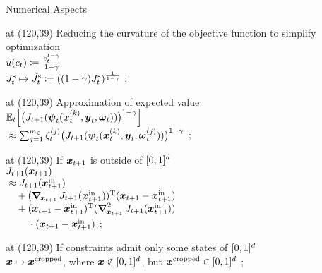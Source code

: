 \begin{frame}{\insertsubsection}{Numerical Aspects}
\begin{overlay}
     at (120,39) {%
      Reducing the curvature of the objective function
      to simplify optimization\\[0.5em]
      $
        u(c_t)
        \coloneqq \frac{c_t^{1-\gamma}}{1-\gamma}
      $\\[0.5em]
      $
        \valueintp_t \mapsto \cetvalueintp_t
        \ceq ((1 - \riskav) \valueintp_t)^{\frac{1}{1-\riskav}}
      $%
    };
    
     at (120,39) {%
      Approximation of expected value\\[0.5em]
      $
      \expectation[t]{
        \bigl(
          \valuefun_{t+1}(
            \statefun_t(\state_t^{(k)}, \policy_t, \stochastic_t)
          )
        \bigr)^{1-\riskav}
      }
      $\\
      $
        {} \approx \sum_{j=1}^{m_{\zeta}} \zeta_t^{(j)}
        \bigl(
          J_{t+1}(
            {\boldsymbol{\psi}}_t({\boldsymbol{x}}_t^{(k)}, {\boldsymbol{y}}_t, {\boldsymbol{\omega}}_t^{(j)})
          )
        \bigr)^{1-\gamma}
      $%
    };
    
     at (120,39) {%
      If ${\boldsymbol{x}}_{t+1}$ is outside of $\mathopen[0, 1\mathclose]^d$\\[0.5em]
      $J_{t+1}({\boldsymbol{x}}_{t+1})$\\[0.2em]
      ${} \approx J_{t+1}({\boldsymbol{x}}_{t+1}^\mathrm{in})$\\[0.2em]
      $
        \quad {} +
        \tr{
          (
            \gradient{\state_{t+1}}{\valuefun_{t+1}}(
              \state_{t+1}^\mathrm{in}
            )
          )
        }
        (\state_{t+1} - \state_{t+1}^\mathrm{in})
      $\\[0.2em]
      $
        \quad {} +
        ({\boldsymbol{x}}_{t+1} - {\boldsymbol{x}}_{t+1}^\mathrm{in})^\mathrm{T}
        (
          \mathop{{\boldsymbol{\nabla}}_{\hspace*{-0.1em}{\boldsymbol{x}}_{t+1}}^2} J_{t+1}(
            {\boldsymbol{x}}_{t+1}^\mathrm{in}
          )
        )
      $\\
      $\qquad\; {} \cdot ({\boldsymbol{x}}_{t+1} - {\boldsymbol{x}}_{t+1}^\mathrm{in})$%
    };
    
     at (120,39) {%
      If constraints admit only some states of $\mathopen[0, 1\mathclose]^d$\\[0.5em]
      ${\boldsymbol{x}} \mapsto {\boldsymbol{x}}^{\mathrm{cropped}}$,
      where ${\boldsymbol{x}} \notin \mathopen[0, 1\mathclose]^d$, but
      ${\boldsymbol{x}}^{\mathrm{cropped}} \in \mathopen[0, 1\mathclose]^d$%
    };
    

\end{overlay}
\end{frame}
